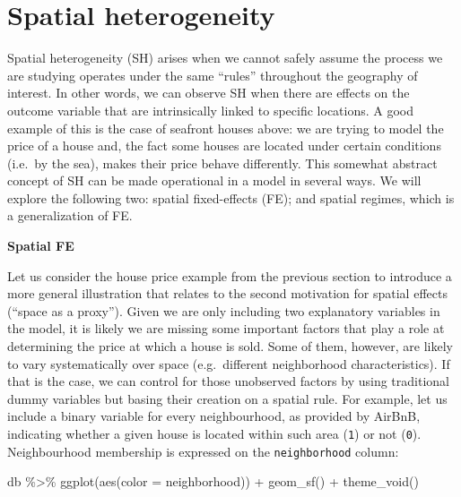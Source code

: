 \documentclass[
  letterpaper,
  krantz2]{style/krantz}
\newenvironment{Shaded}{\begin{snugshade}}{\end{snugshade}}
\newcommand{\AttributeTok}[1]{\textcolor[rgb]{0.40,0.45,0.13}{#1}}
\newcommand{\FunctionTok}[1]{\textcolor[rgb]{0.28,0.35,0.67}{#1}}
\newcommand{\NormalTok}[1]{\textcolor[rgb]{0.00,0.23,0.31}{#1}}
\newcommand{\SpecialCharTok}[1]{\textcolor[rgb]{0.37,0.37,0.37}{#1}}
\begin{document}
\hypertarget{spatial-heterogeneity-1}{%
\section{Spatial heterogeneity}\label{spatial-heterogeneity-1}}

Spatial heterogeneity (SH) arises when we cannot safely assume the
process we are studying operates under the same ``rules'' throughout the
geography of interest. In other words, we can observe SH when there are
effects on the outcome variable that are intrinsically linked to
specific locations. A good example of this is the case of seafront
houses above: we are trying to model the price of a house and, the fact
some houses are located under certain conditions (i.e.~by the sea),
makes their price behave differently. This somewhat abstract concept of
SH can be made operational in a model in several ways. We will explore
the following two: spatial fixed-effects (FE); and spatial regimes,
which is a generalization of FE.

\textbf{Spatial FE}

Let us consider the house price example from the previous section to
introduce a more general illustration that relates to the second
motivation for spatial effects (``space as a proxy''). Given we are only
including two explanatory variables in the model, it is likely we are
missing some important factors that play a role at determining the price
at which a house is sold. Some of them, however, are likely to vary
systematically over space (e.g.~different neighborhood characteristics).
If that is the case, we can control for those unobserved factors by
using traditional dummy variables but basing their creation on a spatial
rule. For example, let us include a binary variable for every
neighbourhood, as provided by AirBnB, indicating whether a given house
is located within such area (\texttt{1}) or not (\texttt{0}).
Neighbourhood membership is expressed on the \texttt{neighborhood}
column:

\begin{Shaded}
\begin{Highlighting}[]
\NormalTok{db }\SpecialCharTok{\%\textgreater{}\%}
  \FunctionTok{ggplot}\NormalTok{(}\FunctionTok{aes}\NormalTok{(}\AttributeTok{color =}\NormalTok{ neighborhood)) }\SpecialCharTok{+}
  \FunctionTok{geom\_sf}\NormalTok{() }\SpecialCharTok{+} 
  \FunctionTok{theme\_void}\NormalTok{()}
\end{Highlighting}
\end{Shaded}
\end{document}

